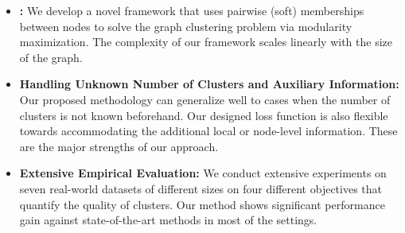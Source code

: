 \begin{itemize}
    \item \textbf{\model:} We develop a novel framework that uses pairwise (soft) memberships between nodes to solve the graph clustering problem via modularity maximization. The complexity of our framework scales linearly with the size of the graph. 

    \item \textbf{Handling Unknown Number of Clusters and Auxiliary Information:} Our proposed methodology can generalize well to cases when the number of clusters is not known beforehand. Our designed loss function is also flexible towards accommodating the additional local or node-level information. These are the major strengths of our approach. 
 
    \item \textbf{Extensive Empirical Evaluation:} We conduct extensive experiments on seven real-world datasets of different sizes on four different objectives that quantify the quality of clusters. Our method shows significant performance gain against state-of-the-art methods in most of the settings.
    
\end{itemize}


